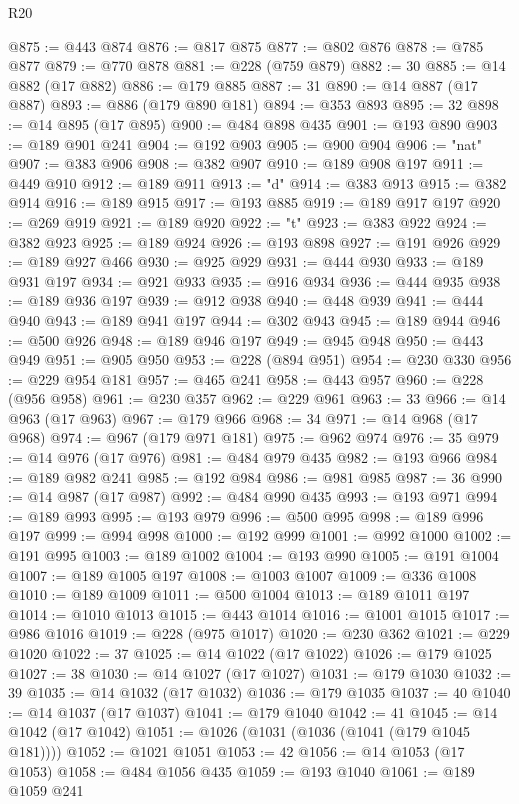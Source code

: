 \begin{lexlean}{R20}
\begin{coremodule}
@875 := @443 @874
@876 := @817 @875
@877 := @802 @876
@878 := @785 @877
@879 := @770 @878
@881 := @228 (@759 @879)
@882 := 30
@885 := @14 @882 (@17 @882)
@886 := @179 @885
@887 := 31
@890 := @14 @887 (@17 @887)
@893 := @886 (@179 @890 @181)
@894 := @353 @893
@895 := 32
@898 := @14 @895 (@17 @895)
@900 := @484 @898 @435
@901 := @193 @890
@903 := @189 @901 @241
@904 := @192 @903
@905 := @900 @904
@906 := "nat"
@907 := @383 @906
@908 := @382 @907
@910 := @189 @908 @197
@911 := @449 @910
@912 := @189 @911
@913 := "d"
@914 := @383 @913
@915 := @382 @914
@916 := @189 @915
@917 := @193 @885
@919 := @189 @917 @197
@920 := @269 @919
@921 := @189 @920
@922 := "t"
@923 := @383 @922
@924 := @382 @923
@925 := @189 @924
@926 := @193 @898
@927 := @191 @926
@929 := @189 @927 @466
@930 := @925 @929
@931 := @444 @930
@933 := @189 @931 @197
@934 := @921 @933
@935 := @916 @934
@936 := @444 @935
@938 := @189 @936 @197
@939 := @912 @938
@940 := @448 @939
@941 := @444 @940
@943 := @189 @941 @197
@944 := @302 @943
@945 := @189 @944
@946 := @500 @926
@948 := @189 @946 @197
@949 := @945 @948
@950 := @443 @949
@951 := @905 @950
@953 := @228 (@894 @951)
@954 := @230 @330
@956 := @229 @954 @181
@957 := @465 @241
@958 := @443 @957
@960 := @228 (@956 @958)
@961 := @230 @357
@962 := @229 @961
@963 := 33
@966 := @14 @963 (@17 @963)
@967 := @179 @966
@968 := 34
@971 := @14 @968 (@17 @968)
@974 := @967 (@179 @971 @181)
@975 := @962 @974
@976 := 35
@979 := @14 @976 (@17 @976)
@981 := @484 @979 @435
@982 := @193 @966
@984 := @189 @982 @241
@985 := @192 @984
@986 := @981 @985
@987 := 36
@990 := @14 @987 (@17 @987)
@992 := @484 @990 @435
@993 := @193 @971
@994 := @189 @993
@995 := @193 @979
@996 := @500 @995
@998 := @189 @996 @197
@999 := @994 @998
@1000 := @192 @999
@1001 := @992 @1000
@1002 := @191 @995
@1003 := @189 @1002
@1004 := @193 @990
@1005 := @191 @1004
@1007 := @189 @1005 @197
@1008 := @1003 @1007
@1009 := @336 @1008
@1010 := @189 @1009
@1011 := @500 @1004
@1013 := @189 @1011 @197
@1014 := @1010 @1013
@1015 := @443 @1014
@1016 := @1001 @1015
@1017 := @986 @1016
@1019 := @228 (@975 @1017)
@1020 := @230 @362
@1021 := @229 @1020
@1022 := 37
@1025 := @14 @1022 (@17 @1022)
@1026 := @179 @1025
@1027 := 38
@1030 := @14 @1027 (@17 @1027)
@1031 := @179 @1030
@1032 := 39
@1035 := @14 @1032 (@17 @1032)
@1036 := @179 @1035
@1037 := 40
@1040 := @14 @1037 (@17 @1037)
@1041 := @179 @1040
@1042 := 41
@1045 := @14 @1042 (@17 @1042)
@1051 := @1026 (@1031 (@1036 (@1041 (@179 @1045 @181))))
@1052 := @1021 @1051
@1053 := 42
@1056 := @14 @1053 (@17 @1053)
@1058 := @484 @1056 @435
@1059 := @193 @1040
@1061 := @189 @1059 @241

\end{coremodule}
\end{lexlean}
